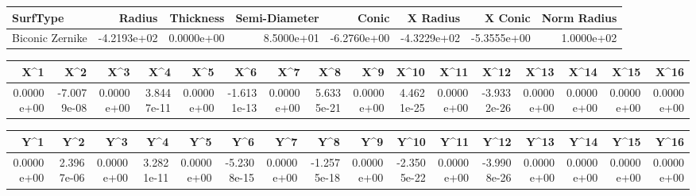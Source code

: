 \documentclass[varwidth=\maxdimen, convert={convertexe={magick.exe}}]{standalone}
\begin{document}
\begin{tabular}{lrrrrrrr}
\toprule
       SurfType &      Radius &  Thickness &  Semi-Diameter &       Conic &    X Radius &     X Conic &  Norm Radius \\
\midrule
Biconic Zernike & -4.2193e+02 & 0.0000e+00 &     8.5000e+01 & -6.2760e+00 & -4.3229e+02 & -5.3555e+00 &   1.0000e+02 \\
\bottomrule
\end{tabular}

\begin{tabular}{rrrrrrrrrrrrrrrr}
\toprule
       X\textasciicircum 1 &         X\textasciicircum 2 &        X\textasciicircum 3 &        X\textasciicircum 4 &        X\textasciicircum 5 &         X\textasciicircum 6 &        X\textasciicircum 7 &        X\textasciicircum 8 &        X\textasciicircum 9 &       X\textasciicircum 10 &       X\textasciicircum 11 &        X\textasciicircum 12 &       X\textasciicircum 13 &       X\textasciicircum 14 &       X\textasciicircum 15 &       X\textasciicircum 16 \\
\midrule
0.0000e+00 & -7.0079e-08 & 0.0000e+00 & 3.8447e-11 & 0.0000e+00 & -1.6131e-13 & 0.0000e+00 & 5.6335e-21 & 0.0000e+00 & 4.4621e-25 & 0.0000e+00 & -3.9332e-26 & 0.0000e+00 & 0.0000e+00 & 0.0000e+00 & 0.0000e+00 \\
\bottomrule
\end{tabular}

\begin{tabular}{rrrrrrrrrrrrrrrr}
\toprule
       Y\textasciicircum 1 &        Y\textasciicircum 2 &        Y\textasciicircum 3 &        Y\textasciicircum 4 &        Y\textasciicircum 5 &         Y\textasciicircum 6 &        Y\textasciicircum 7 &         Y\textasciicircum 8 &        Y\textasciicircum 9 &        Y\textasciicircum 10 &       Y\textasciicircum 11 &        Y\textasciicircum 12 &       Y\textasciicircum 13 &       Y\textasciicircum 14 &       Y\textasciicircum 15 &       Y\textasciicircum 16 \\
\midrule
0.0000e+00 & 2.3967e-06 & 0.0000e+00 & 3.2821e-11 & 0.0000e+00 & -5.2308e-15 & 0.0000e+00 & -1.2575e-18 & 0.0000e+00 & -2.3505e-22 & 0.0000e+00 & -3.9908e-26 & 0.0000e+00 & 0.0000e+00 & 0.0000e+00 & 0.0000e+00 \\
\bottomrule
\end{tabular}
\end{document}
